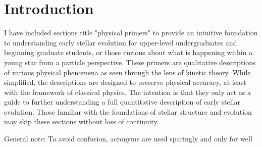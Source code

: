 \section{Introduction}
I have included sections title "physical primers" to provide an intuitive foundation to understanding early stellar evolution for upper-level undergraduates and beginning graduate students, or those curious about what is happening within a young star from a particle perspective. These primers are qualitative descriptions of various physical phenomena as seen through the lens of kinetic theory. While simplified, the descriptions are designed to preserve physical accuracy, at least with the framework of classical physics. The intention is that they only act as a guide to further understanding a full quantitative description of early stellar evolution. Those familiar with the foundations of stellar structure and evolution may skip these sections without loss of continuity.

General note: To avoid confusion, acronyms are used sparingly and only for well